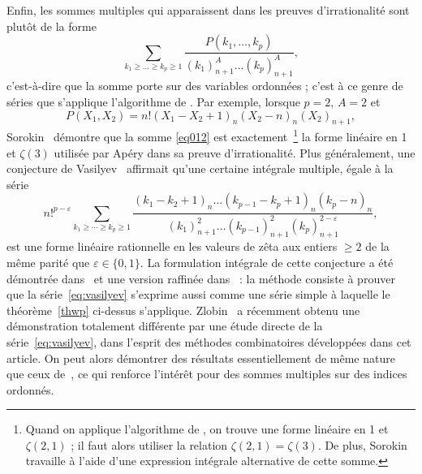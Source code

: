 \documentclass[12pt,francais, reqno]{smfart}
\numberwithin{equation}{section}
\begin{document}
Enfin, les  sommes multiples qui apparaissent dans les preuves d'irrationalit\'e sont plut\^ot de la forme
\begin{equation} \label{eq012}
\sum_{k_1 \geq  \ldots \geq   k_p \ge 1} 
\frac{P(k_1, \ldots, k_p)}{(k_1)_{n+1}^{A} \ldots (k_p)_{n+1}^{A} }, 
\end{equation}
c'est-\`a-dire que la somme porte sur des variables ordonn\'ees ;  c'est \`a ce genre de s\'eries 
que s'applique l'algorithme de \cite{CFRalgo}.  Par exemple, lorsque $p=2$, $A=2$ et
$$
P(X_1, X_2) = n! (X_1-X_2+1)_n (X_2-n)_n(X_2)_{n+1},
$$
Sorokin~\cite{SorokinApery} d\'emontre que la somme \eqref{eq012}  
est exactement~\footnote{Quand on applique l'algorithme 
de \cite{CFRalgo}, on trouve une forme lin\'eaire en 1 et $\zeta(2,1)$ ; il faut alors utiliser 
la relation $\zeta(2,1) = \zeta(3)$. De plus, Sorokin travaille \`a l'aide d'une expression int\'egrale 
alternative de cette somme.} la forme lin\'eaire en 1 et $\zeta(3)$ utilis\'ee par Ap\'ery 
dans sa preuve d'irrationalit\'e. Plus g\'en\'eralement, une conjecture de Vasilyev~\cite{Vasilyev}
affirmait qu'une certaine int\'egrale multiple, \'egale \`a la s\'erie 
\begin{equation}\label{eq:vasilyev}
n!^{p-\varepsilon}\sum_{k_1 \geq  \cdots \geq   k_p \ge 1} 
\frac{(k_1-k_2+1)_n \ldots(k_{p-1}-k_p+1)_n (k_p-n)_n }{(k_1)_{n+1}^{2} \ldots (k_{p-1})_{n+1}^{2}(k_p)_{n+1}^{2-\varepsilon} }, 
\end{equation}
est une forme lin\'eaire rationnelle en les valeurs de z\^eta aux entiers $\ge 2$ 
de la m\^eme parit\'e que $\varepsilon\in\{0,1\}$. La formulation int\'egrale de cette 
conjecture a \'et\'e d\'emontr\'ee dans~\cite{Zudilinservice} et une version 
raffin\'ee dans~\cite{KR} : la m\'ethode consiste \`a prouver que la s\'erie~\eqref{eq:vasilyev} s'exprime aussi  
comme une s\'erie simple \`a laquelle le th\'eor\`eme~\ref{thwp} ci-dessus s'applique. 
Zlobin~\cite{Zlobincoeff} a r\'ecemment obtenu une d\'emonstration totalement diff\'erente 
par une \'etude directe de la s\'erie~\eqref{eq:vasilyev}, dans l'esprit des m\'ethodes combinatoires 
d\'evelopp\'ees dans cet article. On peut alors d\'emontrer des r\'esultats essentiellement de m\^eme
nature que ceux de~\cite{BR, RivoalCRAS}, ce qui renforce l'int\'er\^et pour des sommes multiples 
 sur des indices ordonn\'es.




\bigskip
\end{document}
